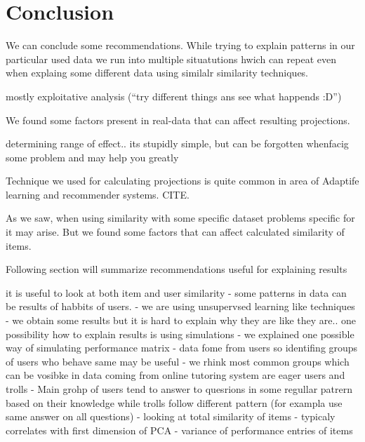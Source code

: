 \documentclass[
  digital, %
  table,   %
  nolof,     %
  nolot,     %
  nocover
]{fithesis3}
\begin{document}
\chapter{Conclusion}



We can conclude some recommendations. While trying to explain patterns
in our particular used data we run into multiple situatutions hwich can
repeat even when explaing some different data using similalr similarity techniques.


mostly exploitative analysis (``try different things ans see what happends :D'')

We found some factors present in real-data that can affect resulting projections.

determining range of effect.. its stupidly simple, but can be forgotten whenfacig some problem and may help you greatly


Technique we used for calculating projections is quite common in area of
Adaptife learning and recommender systems. CITE.

As we saw, when using similarity with some specific dataset problems specific for it may arise. But we found some factors that can affect calculated similarity of items.

Following section will summarize recommendations useful for explaining
results

it is useful to look at both item and user similarity - some
patterns in data can be results of habbits of users. - we are using
unsupervsed learning like techniques - we obtain some results but it is
hard to explain why they are like they are.. one possibility how to
explain results is using simulations - we explained one possible way of
simulating performance matrix - data fome from users so identifing
groups of users who behave same may be useful - we rhink most common
groups which can be vosibke in data coming from online tutoring system
are eager users and trolls - Main grohp of users tend to answer to
quesrions in some regullar patrern based on their knowledge while trolls
follow different pattern (for exampla use same answer on all questions)
- looking at total similarity of items - typicaly correlates with first
dimension of PCA - variance of performance entries of items

\end{document}
